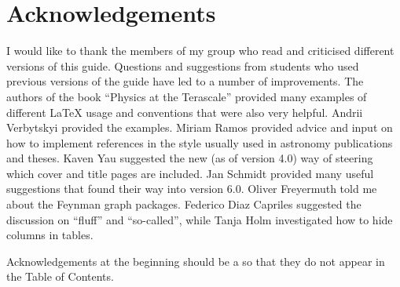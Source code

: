 \chapter*{Acknowledgements}%
\label{sec:ack1}

I would like to thank the members of my group who read and criticised
different versions of this guide. Questions and suggestions from
students who used previous versions of the guide have led to a number
of improvements. The authors of the book \enquote{Physics at the
Terascale} provided many examples of different \LaTeX{} usage and
conventions that were also very helpful.
Andrii Verbytskyi provided the \TikZ examples.
Miriam Ramos provided advice and input on how to implement references 
in the style usually used in astronomy publications and theses.
Kaven Yau suggested the new (as of version 4.0) way of steering which cover
and title pages are included.
Jan Schmidt provided many useful suggestions that found their way into version 6.0.
Oliver Freyermuth told me about the \TikZ Feynman graph packages.
Federico Diaz Capriles suggested the discussion on \enquote{fluff} and \enquote{so-called},
while Tanja Holm investigated how to hide columns in tables.

Acknowledgements at the beginning should be a  so that they
do not appear in the Table of Contents.

